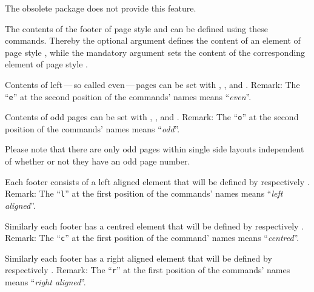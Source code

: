 The obsolete package  does not
provide this feature.%
%
\EndIndexGroup


\begin{Declaration}
\end{Declaration}
The contents of the footer of page style  and
 can be defined using these commands. Thereby the
optional argument defines the content of an element of page style
, while the mandatory argument sets the content
of the corresponding element of page style .

Contents of left\,---\,so called even\,---\,pages can be set with
, , and . Remark: The ``\texttt{e}''
at the second position of the commands' names means ``\emph{even}''.

Contents of odd pages can be set with , , and
. Remark: The ``\texttt{o}'' at the second position of the
commands' names means ``\emph{odd}''.

Please note that there are only odd pages within single
side layouts independent of whether or not they have an odd page number.

Each footer consists of a left aligned element that will be defined by
 respectively . Remark: The ``\texttt{l}'' at the
first position of the commands' names means ``\emph{left aligned}''.

Similarly each footer has a centred element that will be defined by
 respectively . Remark: The ``\texttt{c}'' at the
first position of the command' names means ``\emph{centred}''.

Similarly each footer has a right aligned element that will be defined by
 respectively . Remark: The ``\texttt{r}'' at the
first position of the commands' names means ``\emph{right aligned}''.

